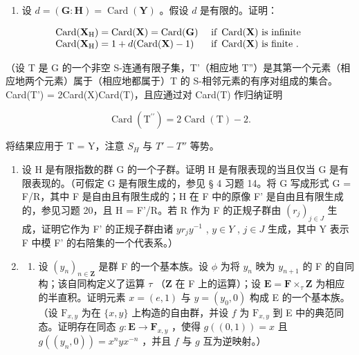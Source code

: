 \begin{enumerate}
\def\labelenumi{(\alph{enumi})}
\setcounter{enumi}{4}
\tightlist
\item
  设 \(d = (\mathbf{G}:\mathbf{H}) = \operatorname{Card}(\mathbf{Y})\) 。假设 \(d\) 是有限的。证明：
\end{enumerate}

\[
\begin{array}{l l} \operatorname{Card} (\mathbf {X} _ {\mathrm{H}}) = \operatorname{Card} (\mathbf {X}) = \operatorname{Card} (\mathbf {G}) & \text { if } \operatorname{Card} (\mathbf {X}) \text { is   infinite } \\ \operatorname{Card} (\mathbf {X} _ {\mathrm{H}}) = 1 + d (\operatorname{Card} (\mathbf {X}) - 1) & \text { if } \operatorname{Card} (\mathbf {X}) \text { is   finite }. \end{array}
\]

（设 T 是 G 的一个非空 S-连通有限子集，T'（相应地 T''）是其第一个元素（相应地两个元素）属于（相应地都属于）T 的 S-相邻元素的有序对组成的集合。Card(T') = 2Card(X)Card(T)，且应通过对 Card(T) 作归纳证明

\[
\operatorname{Card} \left(\mathrm{T} ^ {\prime \prime}\right) = 2 \operatorname{Card} (\mathrm{T}) - 2.
\]

将结果应用于 T = Y，注意 \(S_{H}\) 与 \(T' - T''\) 等势。

\begin{enumerate}
\def\labelenumi{\arabic{enumi}.}
\setcounter{enumi}{20}
\item
  设 H 是有限指数的群 G 的一个子群。证明 H 是有限表现的当且仅当 G 是有限表现的。（可假定 G 是有限生成的，参见 § 4 习题 14。将 G 写成形式 G = F/R，其中 F 是自由且有限生成的；H 在 F 中的原像 F' 是自由且有限生成的，参见习题 20，且 H = F'/R。若 R 作为 F 的正规子群由 \((r_{j})_{j\in J}\) 生成，证明它作为 F' 的正规子群由诸 \(yr_{j}y^{-1}\) , \(y\in Y\) , \(j\in J\) 生成，其中 Y 表示 F 中模 F' 的右陪集的一个代表系。）
\item
  \begin{enumerate}
  \def\labelenumii{(\alph{enumii})}
  \tightlist
  \item
    设 \((y_{n})_{n\in \mathbf{Z}}\) 是群 F 的一个基本族。设 \(\phi\) 为将 \(y_{n}\) 映为 \(y_{n + 1}\) 的 F 的自同构；该自同构定义了运算 \(\tau\) （\(\mathbf{Z}\) 在 F 上的运算）；设 \(\mathbf{E} = \mathbf{F}\times_{\tau}\mathbf{Z}\) 为相应的半直积。证明元素 \(x = (e,1)\) 与 \(y = (y_0,0)\) 构成 E 的一个基本族。（设 \(\mathrm{F}_{x,y}\) 为在 \(\{x,y\}\) 上构造的自由群，并设 \(f\) 为 \(\mathrm{F}_{x,y}\) 到 E 中的典范同态。证明存在同态 \(g\colon \mathbf{E}\to \mathbf{F}_{x,y}\) ，使得 \(g((0,1)) = x\) 且 \(g((y_n,0)) = x^n yx^{-n}\) ，并且 \(f\) 与 \(g\) 互为逆映射。）
  \end{enumerate}
\end{enumerate}

